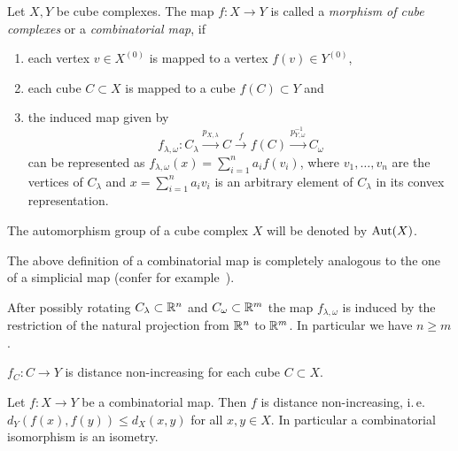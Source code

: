 \begin{defin}
  \label{def:morphism-ccc}
  Let \(X,Y\) be cube complexes. The map \(f\colon X \to Y\) is called a \emph{morphism of cube complexes} or a \emph{combinatorial map}, if
  \begin{enumerate}
  \item each vertex \(v \in X^{(0)}\) is mapped to a vertex \(f(v) \in Y^{(0)}\),
  \item each cube \(C \subset X\) is mapped to a cube \(f(C) \subset Y\) and
  \item the induced map given by
    \[
      f_{\lambda, \omega}\colon C_\lambda \xrightarrow{p_{X,\lambda}} C \xrightarrow{f} f(C) \xrightarrow{p^{-1}_{Y,\omega}} C_\omega
    \]
    can be represented as \(f_{\lambda,\omega}(x) = \sum_{i=1}^n a_i f(v_i)\), where \(v_1, \dots, v_n\) are the vertices of \(C_\lambda\) and \(x = \sum_{i=1}^n a_i v_i\) is an arbitrary element of \(C_\lambda\) in its convex representation.
  \end{enumerate}
  The automorphism group of a cube complex \(X\) will be denoted by \(\operatorname{Aut}(X)\).
\end{defin}

\begin{rem}
  The above definition of a combinatorial map is completely analogous to the one of a simplicial map (confer for example~\cite{Singer}).
\end{rem}

\begin{lemma}
  After possibly rotating \(C_\lambda \subset \mathbb{R}^n\) and \(C_\omega \subset \mathbb{R}^m\) the map \(f_{\lambda, \omega}\) is induced by the restriction of the natural projection from \(\mathbb{R}^n\) to \(\mathbb{R}^m\). In particular we have \(n \geq m\).
\end{lemma}

\begin{cor}
  \(f_C\colon C \to Y\) is distance non-increasing for each cube \(C \subset X\).
\end{cor}

\begin{prop}
  Let \(f\colon X \to Y\) be a combinatorial map. Then \(f\) is distance non-increasing, i.\,e.\ \(d_Y(f(x), f(y)) \leq d_X(x,y)\) for all \(x,y \in X\). In particular a combinatorial isomorphism is an isometry.
\end{prop}

